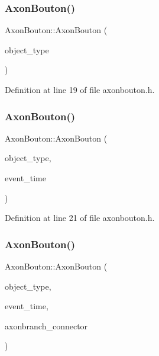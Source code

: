 \subsubsection{\texorpdfstring{Axon\+Bouton()}{AxonBouton()}\hspace{0.1cm}{\footnotesize\ttfamily [2/4]}}
{\footnotesize\ttfamily Axon\+Bouton\+::\+Axon\+Bouton (\begin{DoxyParamCaption}\item[{unsigned int}]{object\+\_\+type }\end{DoxyParamCaption})\hspace{0.3cm}{\ttfamily [inline]}}



Definition at line 19 of file axonbouton.\+h.

\mbox{\label{class_axon_bouton_a93e33d72d90801d29d2b16ef94b59fab}} 
\subsubsection{\texorpdfstring{Axon\+Bouton()}{AxonBouton()}\hspace{0.1cm}{\footnotesize\ttfamily [3/4]}}
{\footnotesize\ttfamily Axon\+Bouton\+::\+Axon\+Bouton (\begin{DoxyParamCaption}\item[{unsigned int}]{object\+\_\+type,  }\item[{std\+::chrono\+::time\+\_\+point$<$ \mbox{\hyperlink{universe_8h_a0ef8d951d1ca5ab3cfaf7ab4c7a6fd80}{Clock}} $>$}]{event\+\_\+time }\end{DoxyParamCaption})\hspace{0.3cm}{\ttfamily [inline]}}



Definition at line 21 of file axonbouton.\+h.

\mbox{\label{class_axon_bouton_a6d671fc3b6bd8e617085c1bc7212400d}} 
\subsubsection{\texorpdfstring{Axon\+Bouton()}{AxonBouton()}\hspace{0.1cm}{\footnotesize\ttfamily [4/4]}}
{\footnotesize\ttfamily Axon\+Bouton\+::\+Axon\+Bouton (\begin{DoxyParamCaption}\item[{unsigned int}]{object\+\_\+type,  }\item[{std\+::chrono\+::time\+\_\+point$<$ \mbox{\hyperlink{universe_8h_a0ef8d951d1ca5ab3cfaf7ab4c7a6fd80}{Clock}} $>$}]{event\+\_\+time,  }\item[{\mbox{\hyperlink{class_axon_branch}{Axon\+Branch}} \&}]{axonbranch\+\_\+connector }\end{DoxyParamCaption})\hspace{0.3cm}{\ttfamily [inline]}}



